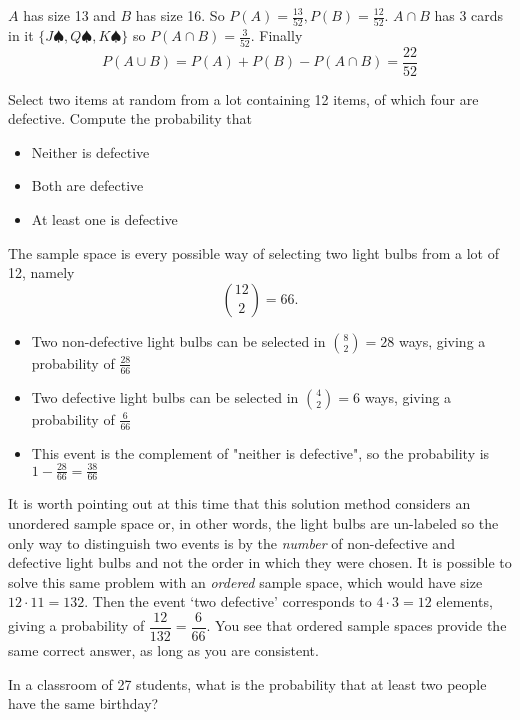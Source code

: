 \documentclass[../main.tex]{subfiles}
\begin{document}
\begin{solution}
	$A$ has size 13 and $B$ has size 16. So $P(A) = \frac{13}{52},
	P(B) = \frac{12}{52}$. $A \cap B$ has 3 cards in it $\{
	J\spadesuit, Q\spadesuit, K\spadesuit\}$ so
	$P(A \cap B) = \frac{3}{52}$. Finally
	$$P(A \cup B) = P(A) + P(B) - P(A\cap B) = \frac{22}{52}$$
\end{solution}

\begin{example}
	Select two items at random from a lot containing 12 items, of which four are defective. Compute the probability that
	\begin{itemize}
		\item Neither is defective
		\item Both are defective
		\item At least one is defective
	\end{itemize}
\end{example}

\begin{solution}
	The sample space is every possible way of selecting two light bulbs from a lot of 12, namely $${12 \choose 2} = 66.$$
	\begin{itemize}
		\item Two non-defective light bulbs can be selected
		in ${8 \choose 2} = 28$ ways, giving a probability
		of $\frac{28}{66}$
		\item Two defective light bulbs can be selected in ${4
		\choose 2} = 6$ ways, giving a probability of $\frac{6}{66}$
		\item This event is the complement of "neither is defective",
		so the probability is $1-\frac{28}{66} = \frac{38}{66}$
	\end{itemize}

	It is worth pointing out at this time that this solution
	method considers an unordered sample space or, in other words,
	the light bulbs are un-labeled so the only way to distinguish
	two events is by the \textit{number} of non-defective and
	defective light bulbs and not the order in which they were
	chosen. It is possible to solve this same problem with an
	\textit{ordered} sample space, which would have size $12\cdot11 = 132$. Then the event `two defective' corresponds
	to $4 \cdot 3 = 12$ elements, giving a probability
	of $\dfrac{12}{132} = \dfrac{6}{66}$. You see that
	ordered sample spaces provide the same correct answer, as long
	as you are consistent.
\end{solution}

\begin{example}
	In a classroom of 27 students, what is the probability
	that at least two people have the same birthday?
\end{example}
\end{document}
